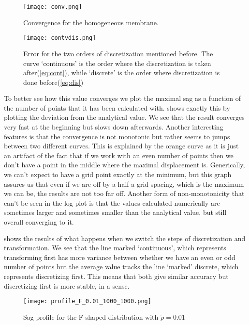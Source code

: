 \documentclass[10pt,a4paper,twocolumn]{article}
\begin{document}
\begin{figure}[!t]
    \centering
    \texttt{[image: conv.png]}
    \caption{Convergence for the homogeneous membrane.}
    \label{fig:conv}
\end{figure}



\begin{figure}[!b]
    \centering
    \texttt{[image: contvdis.png]}
    \caption{Error for the two orders of discretization mentioned before. The curve `continuous' is the order where the discretization is taken after(\cref{eq:cont}), while `discrete' is the order where discretization is done before(\cref{eq:dis})}
    \label{fig:contvdis}
\end{figure}




To better see how this value converges we plot the maximal sag as a function of the number of points that it has been calculated with.  shows exactly this by plotting the deviation from the analytical value. We see that the result converges very fast at the beginning but slows down afterwards. Another interesting features is that the convergence is not monotonic but rather seems to jumps between two different curves. This is explained by the orange curve as it is just an artifact of the fact that if we work with an even number of points then we don't have a point in the middle where the maximal displacement is. Generically, we can't expect to have a grid point exactly at the minimum, but this graph assures us that even if we are off by a half a grid spacing, which is the maximum we can be, the results are not too far off. Another form of non-monotonicity that can't be seen in the log plot is that the values calculated numerically are sometimes larger and sometimes smaller than the analytical value, but still overall converging to it.

 shows the results of what happens when we switch the steps of discretization and transformation. We see that the line marked `continuous', which represents transforming first has more variance between whether we have an even or odd number of points but the average value tracks the line `marked' discrete, which represents discretizing first. This means that both give similar accuracy but discretizing first is more stable, in a sense.  

\begin{figure}[!b]
    \centering
    \texttt{[image: profile\_F\_0.01\_1000\_1000.png]}
    \caption{Sag profile for the F-shaped distribution with $\tilde{\rho} = 0.01$}
    \label{fig:profile_F_0.01}
\end{figure}
\end{document}
